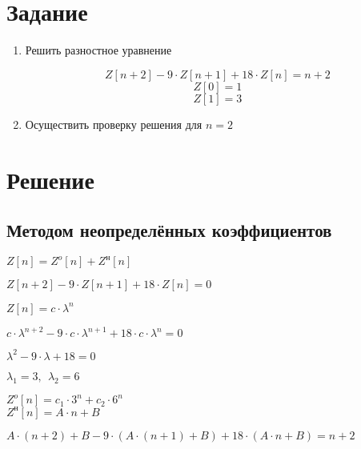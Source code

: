 




\section{Задание}

\begin{enumerate}

\item Решить разностное уравнение

\begin{displaymath}
Z[n+2] - 9 \cdot Z[n+1] + 18 \cdot Z[n] = n + 2
\end{displaymath}
\begin{displaymath}
Z[0] = 1
\end{displaymath}
\begin{displaymath}
 Z[1] = 3
\end{displaymath}

\item Осуществить проверку решения для $n = 2$

\end{enumerate}

\section{Решение}

\subsection{Методом неопределённых коэффициентов}

$Z[n] = Z^{o}[n] + Z^{\text{н}}[n]$

$Z[n+2] - 9 \cdot Z[n+1] + 18 \cdot Z[n] = 0$

$Z[n] = c \cdot \lambda^n$

$c \cdot \lambda^{n+2} - 9 \cdot c \cdot \lambda^{n+1} + 18 \cdot c \cdot \lambda^{n} = 0$

$\lambda^2 - 9 \cdot \lambda + 18 = 0$

$\lambda_1 = 3, \ \ \lambda_2 = 6$

$Z^{o}[n] = c_1 \cdot 3^n + c_2 \cdot 6^n$\\[0.3cm]

$Z^{\text{н}}[n] = A \cdot n + B$

$A \cdot (n + 2) + B - 9 \cdot (A \cdot (n + 1) + B) + 18 \cdot (A \cdot n + B) = n + 2$

